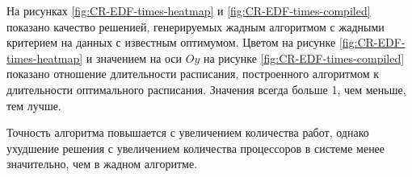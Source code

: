 На рисунках \ref{fig:CR-EDF-times-heatmap} и \ref{fig:CR-EDF-times-compiled} показано качество решенией, генерируемых жадным алгоритмом с жадными критерием на данных с известным оптимумом. Цветом на рисунке \ref{fig:CR-EDF-times-heatmap} и значением на оси $Oy$ на рисунке \ref{fig:CR-EDF-times-compiled} показано отношение длительности расписания, построенного алгоритмом к длительности оптимального расписания. Значения всегда больше 1, чем меньше, тем лучше.

Точность алгоритма повышается с увеличением количества работ, однако ухудшение решения с увеличением количества процессоров в системе менее значительно, чем в жадном алгоритме. 


